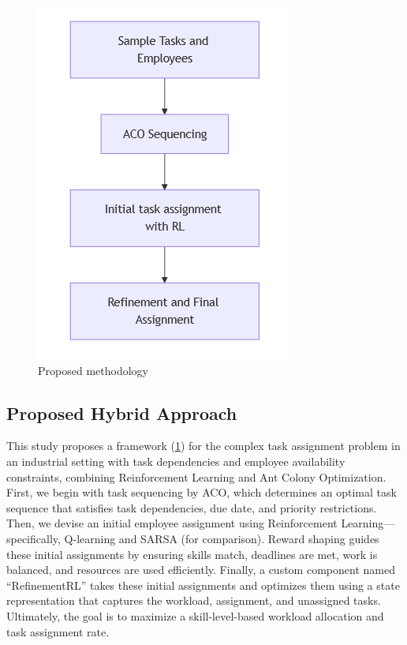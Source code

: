 \documentclass[conference]{IEEEtran}
\begin{document}
	\begin{figure}[!htb]
		\centering
		\includegraphics[width=0.7\linewidth]{figures/Initial_flow}
		\caption[Proposed methodology]{Proposed methodology}
		\label{fig:flow}
	\end{figure}

	\subsection{Proposed Hybrid Approach}
	This study proposes a framework (\ref{fig:flow}) for the complex task
	assignment problem in an industrial setting with task dependencies and
	employee availability constraints, combining Reinforcement Learning and Ant Colony
	Optimization. First, we begin with task sequencing by ACO, which determines an
	optimal task sequence that satisfies task dependencies, due date, and priority
	restrictions. Then, we devise an initial employee assignment using
	Reinforcement Learning—specifically, Q-learning and SARSA (for comparison).
	Reward shaping guides these initial assignments by ensuring skills match, deadlines
	are met, work is balanced, and resources are used efficiently. Finally, a custom
	component named ``RefinementRL'' takes these initial assignments and optimizes
	them using a state representation that captures the workload, assignment, and unassigned
	tasks. Ultimately, the goal is to maximize a skill-level-based workload allocation
	and task assignment rate.
\end{document}
